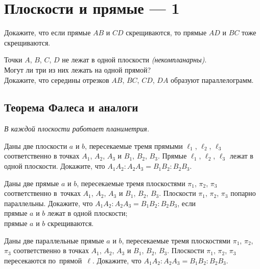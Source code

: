 
\section*{Плоскости и прямые --- 1}

\begin{problems}

\item
Докажите, что если прямые $AB$ и $CD$ скрещиваются, то прямые $AD$ и $BC$ тоже
скрещиваются.

\item
Точки $A$, $B$, $C$, $D$ не лежат в одной плоскости \emph{(некомпланарны)}.
\\
\subproblem
Могут ли три из них лежать на одной прямой?
\\
\subproblem
Докажите, что середины отрезков $AB$, $BC$, $CD$, $DA$ образуют
параллелограмм.

\end{problems}

\subsection*{Теорема Фалеса и аналоги}

\emph{В каждой плоскости работает планиметрия.}

\begin{problems}

\item
Даны две плоскости $a$ и $b$, пересекаемые тремя
прямыми $\ell_1$, $\ell_2$, $\ell_3$ соответственно
в точках $A_1$, $A_2$, $A_3$ и $B_1$, $B_2$, $B_3$.
Прямые $\ell_1$, $\ell_2$, $\ell_3$ лежат в одной плоскости.
Докажите, что $A_1 A_2 : A_2 A_3 = B_1 B_2 : B_2 B_3$.

\item
Даны две прямые $a$ и $b$, пересекаемые тремя
плоскостями $\pi_1$, $\pi_2$, $\pi_3$ соответственно
в~точках $A_1$, $A_2$, $A_3$ и $B_1$, $B_2$, $B_3$.
Плоскости $\pi_1$, $\pi_2$, $\pi_3$ попарно параллельны.
Докажите, что $A_1 A_2 : A_2 A_3 = B_1 B_2 : B_2 B_3$, если
\\
\subproblem
прямые $a$ и $b$ лежат в одной плоскости;
\\
\subproblem
прямые $a$ и $b$ скрещиваются.

\item
Даны две параллельные прямые $a$ и $b$, пересекаемые тремя
плоскостями $\pi_1$, $\pi_2$, $\pi_3$ соответственно
в точках $A_1$, $A_2$, $A_3$ и $B_1$, $B_2$, $B_3$.
Плоскости $\pi_1$, $\pi_2$, $\pi_3$ пересекаются по~прямой~$\ell$.
Докажите, что $A_1 A_2 : A_2 A_3 = B_1 B_2 : B_2 B_3$.

\end{problems}

